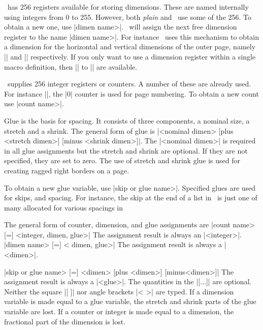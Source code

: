 \tex\ has 256 registers available for storing dimensions. These are named
internally using integers from 0 to 255. However, both {\it plain} and
\intex\ use some of the 256. To obtain a new one, use 
\@|\newdimen\<dimen name>|. \tex\ will assign the next free dimension register
to the name |\<dimen name>|. For instance \intex\ uses this mechanism to
obtain a dimension for the horizontal  and vertical dimensions
of the outer page, namely |\houterpagesize| and |\vouterpagesize|
respectively. If you only want to use a dimension register within a single
macro definition, then || to || are available. 

\tex\ supplies 256 integer registers or counters. A number of these 
are already used. For instance ||, the |0| counter is used for
page numbering. 
To obtain a new count use \@|\newcount\<count name>|. 

Glue is the basis for spacing. It consists of three components, a nominal
size, a stretch and a shrink. The general form of glue is |<nominal dimen>
[plus <stretch dimen>] [minus <shrink dimen>]|. The |<nominal dimen>| is required
in all glue assignments but the stretch and shrink are optional. If they are
not specified, they are set to zero. The use of stretch and shrink glue
is used for creating ragged right borders on a page. 

To obtain a new glue variable, use \@|\newskip\<skip or glue name>|. Specified
glues are used for skips, and spacing. For instance, the skip at the end of a
list in \intex\ is just one of many allocated for various spacings in \tex\

The general form of counter, dimension, and glue assignments are 
\beginblockmode
\mbr
\@|\<count name> [=] <integer, dimen, glue>|
\nbr
The assignment result is always an |<integer>|.
\mbr
\@|\<dimen name> [=] < dimen, glue>|
\nbr
The assignment result is always a |<dimen>|.

\mbr
\@|\<skip or glue name> [=]  <dimen> 
      [plus <dimen>] [minus<dimen>]|
\nbr
The assignment result is always a |<glue>|.
\endblockmode
The quantities in the |[...]| are optional. Neither the square |[ ]| nor angle
brackets |< >| are typed. If a dimension variable is made equal to a glue
variable, the stretch and shrink parts of the glue variable are lost. If a
counter or integer is made equal to a dimension, the fractional part of the
dimension is lost. 

